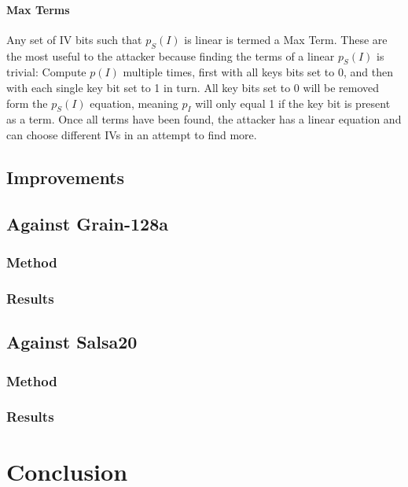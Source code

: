 \documentclass{report}
\begin{document}
\subsubsection{Max Terms}
Any set of IV bits such that $p_S(I)$ is linear is termed a Max Term. These are the most useful to the attacker because finding the terms of a linear $p_S(I)$ is trivial: Compute $p(I)$ multiple times, first with all keys bits set to 0, and then with each single key bit set to 1 in turn. All key bits set to 0 will be removed form the $p_S(I)$ equation, meaning $p_I$ will only equal 1 if the key bit is present as a term. Once all terms have been found, the attacker has a linear equation and can choose different IVs in an attempt to find more.
\section{Improvements}
\section{Against Grain-128a}
\subsection{Method}
\subsection{Results}
\section{Against Salsa20}
\subsection{Method}
\subsection{Results}
\chapter{Conclusion}


\end{document}
